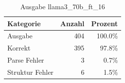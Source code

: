 
\begin{table}[!ht]
\centering
\begin{tabular}{lrr}
\toprule
\textbf{Kategorie} & \textbf{Anzahl} & \textbf{Prozent} \\
\midrule
Ausgabe & 404 & 100.0\% \\
Korrekt & 395 & 97.8\% \\
Parse Fehler & 3 & 0.7\% \\
Struktur Fehler & 6 & 1.5\% \\
\bottomrule
\end{tabular}
\caption{Ausgabe llama3_70b_ft_16}
\label{tab:file_counts}
\end{table}
    